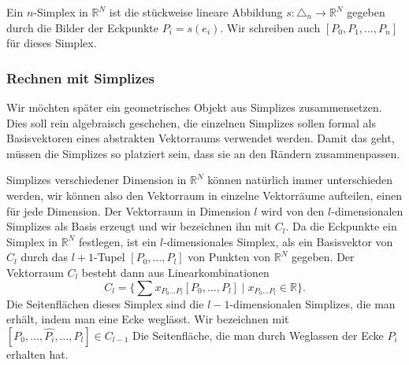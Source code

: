 %


\begin{definition}
Ein $n$-Simplex in $\mathbb{R}^N$ ist die stückweise lineare Abbildung
$s\colon \triangle_n\to \mathbb{R}^N$ gegeben durch die Bilder der Eckpunkte
$P_i = s(e_i)$.
Wir schreiben auch $[P_0,P_1,\dots,P_n]$ für dieses Simplex.
\end{definition}

\subsubsection{Rechnen mit Simplizes}
Wir möchten später ein geometrisches Objekt aus Simplizes zusammensetzen.
Dies soll rein algebraisch geschehen, die einzelnen Simplizes sollen
formal als Basisvektoren eines abstrakten Vektorraums verwendet werden.
Damit das geht, müssen die Simplizes so platziert sein, dass
sie an den Rändern zusammenpassen.

Simplizes verschiedener Dimension in $\mathbb{R}^N$ können natürlich 
immer unterschieden werden, wir können also den Vektorraum in einzelne
Vektorräume aufteilen, einen für jede Dimension.
Der Vektorraum in Dimension $l$ wird von den $l$-dimensionalen Simplizes 
als Basis erzeugt und wir bezeichnen ihn mit $C_l$.
Da die Eckpunkte ein Simplex in $\mathbb{R}^N$ festlegen, ist ein
$l$-dimensionales Simplex, als ein Basisvektor von $C_l$ durch
das $l+1$-Tupel
\(
[P_0,\dots,P_l]
\)
von Punkten von $\mathbb{R}^N$ gegeben.
Der Vektorraum $C_l$ besteht dann aus Linearkombinationen
\[
C_l
=
\biggl\{
\sum x_{P_0\dots P_l} [P_0,\dots,P_l]
\;\bigg|\;
x_{P_0\dots P_l}\in\mathbb{R}
\biggr\}.
\]
Die Seitenflächen dieses Simplex sind die $l-1$-dimensionalen
Simplizes, die man erhält, indem man eine Ecke weglässt.
Wir bezeichnen mit $[P_0,\dots,\widehat{P_i},\dots,P_l] \in C_{l-1}$
Die Seitenfläche, die man durch Weglassen der Ecke $P_i$
erhalten hat.

